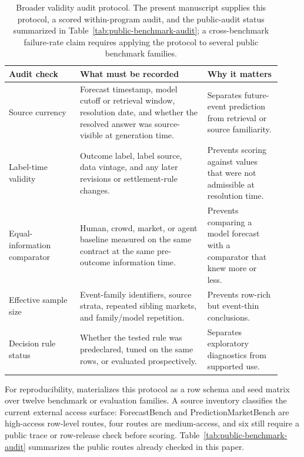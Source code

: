 \documentclass[11pt]{article}
\begin{document}
\begin{table}[p]
\centering
\begingroup
\scriptsize
\setlength{\tabcolsep}{2pt}
\renewcommand{\arraystretch}{0.9}
\begin{tabular}{L{0.24\linewidth} L{0.43\linewidth} L{0.25\linewidth}}
\toprule
Audit check & What must be recorded & Why it matters \\
\midrule
Source currency & Forecast timestamp, model cutoff or retrieval window, resolution date, and whether the resolved answer was source-visible at generation time. & Separates future-event prediction from retrieval or source familiarity. \\
Label-time validity & Outcome label, label source, data vintage, and any later revisions or settlement-rule changes. & Prevents scoring against values that were not admissible at resolution time. \\
Equal-information comparator & Human, crowd, market, or agent baseline measured on the same contract at the same pre-outcome information time. & Prevents comparing a model forecast with a comparator that knew more or less. \\
Effective sample size & Event-family identifiers, source strata, repeated sibling markets, and family/model repetition. & Prevents row-rich but event-thin conclusions. \\
Decision rule status & Whether the tested rule was predeclared, tuned on the same rows, or evaluated prospectively. & Separates exploratory diagnostics from supported use. \\
\bottomrule
\end{tabular}
\caption{Broader validity audit protocol. The present manuscript supplies this protocol, a scored within-program audit, and the public-audit status summarized in Table~\ref{tab:public-benchmark-audit}; a cross-benchmark failure-rate claim requires applying the protocol to several public benchmark families.}
\label{tab:field-audit-protocol}
\endgroup
\end{table}

For reproducibility,  materializes this protocol as a row schema and seed matrix over twelve benchmark or evaluation families. A source inventory classifies the current external access surface: ForecastBench and PredictionMarketBench are high-access row-level routes, four routes are medium-access, and six still require a public trace or row-release check before scoring. Table~\ref{tab:public-benchmark-audit} summarizes the public routes already checked in this paper.
\end{document}
